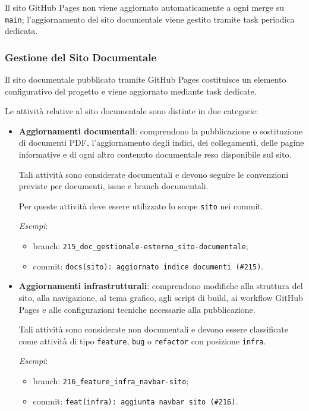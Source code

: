 Il sito GitHub Pages non viene aggiornato automaticamente a ogni merge su
\texttt{main}; l'aggiornamento del sito documentale viene gestito tramite task
periodica dedicata.


\subsubsection{Gestione del Sito Documentale}

Il sito documentale pubblicato tramite GitHub Pages costituisce un elemento
configurativo del progetto e viene aggiornato mediante task dedicate.

Le attività relative al sito documentale sono distinte in due categorie:

\begin{itemize}
\item \textbf{Aggiornamenti documentali}: comprendono la pubblicazione o
sostituzione di documenti PDF, l'aggiornamento degli indici, dei collegamenti,
delle pagine informative e di ogni altro contenuto documentale reso disponibile
sul sito.

Tali attività sono considerate documentali e devono seguire le convenzioni
previste per documenti, issue e branch documentali.

Per queste attività deve essere utilizzato lo scope
\texttt{sito} nei commit.

\textit{Esempi}:

\begin{itemize}
    \item branch:
    \texttt{215\_doc\_gestionale-esterno\_sito-documentale};

    \item commit:
    \texttt{docs(sito): aggiornato indice documenti (\#215)}.
\end{itemize}

\item \textbf{Aggiornamenti infrastrutturali}: comprendono modifiche alla
struttura del sito, alla navigazione, al tema grafico, agli script di build,
ai workflow GitHub Pages e alle configurazioni tecniche necessarie alla
pubblicazione.

Tali attività sono considerate non documentali e devono essere classificate
come attività di tipo \texttt{feature}, \texttt{bug} o \texttt{refactor}
con posizione \texttt{infra}.

\textit{Esempi}:

\begin{itemize}
    \item branch:
    \texttt{216\_feature\_infra\_navbar-sito};

    \item commit:
    \texttt{feat(infra): aggiunta navbar sito (\#216)}.
\end{itemize}
\end{itemize}

